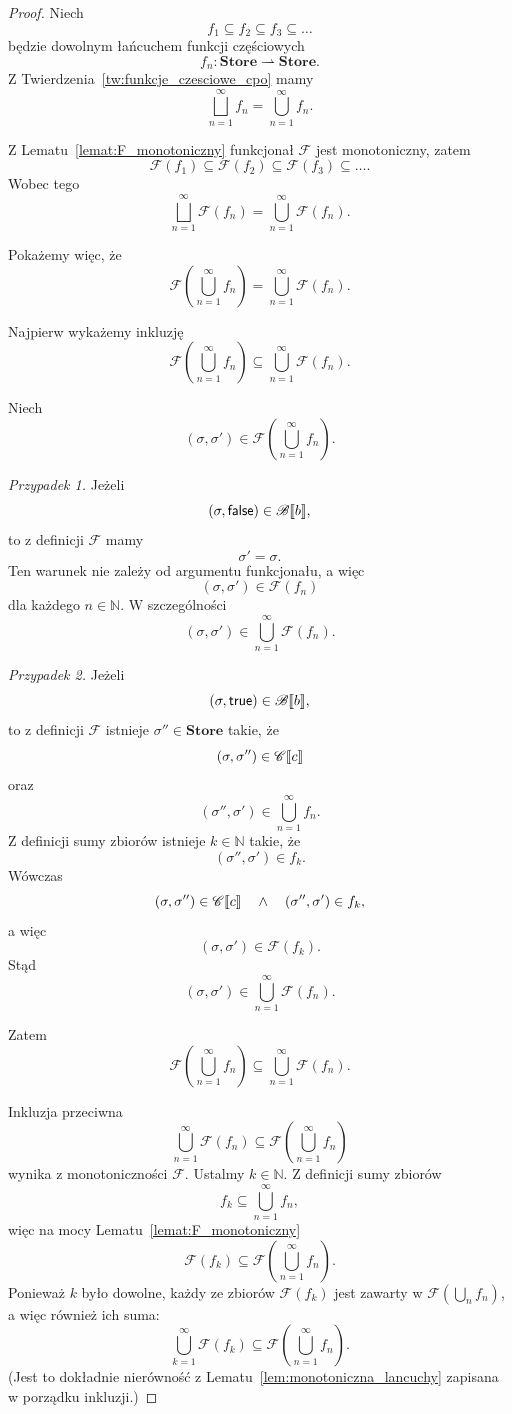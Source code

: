 \documentclass[11pt,a4paper]{article}
\theoremstyle{definition}
\theoremstyle{plain}
\DeclarePairedDelimiter{\semdelim}{\llbracket}{\rrbracket}
\newcommand{\sem}[1]{\semdelim{#1}}
\newcommand{\Cc}{\mathscr{C}}   %
\newcommand{\Bb}{\mathscr{B}}   %
\newcommand{\Store}{\textbf{Store}}
\newcommand{\kw}[1]{\ensuremath{\mathsf{#1}}} %
\begin{document}
\begin{proof}
	Niech
	\[
	f_1\subseteq f_2\subseteq f_3\subseteq\ldots
	\]
	będzie dowolnym łańcuchem funkcji częściowych
	\[
	f_n:\Store\rightharpoonup\Store.
	\]
	Z Twierdzenia~\ref{tw:funkcje_czesciowe_cpo} mamy
	\[
	\bigsqcup_{n=1}^{\infty}f_n
	=
	\bigcup_{n=1}^{\infty}f_n.
	\]
	
	Z Lematu~\ref{lemat:F_monotoniczny} funkcjonał $\mathcal{F}$ jest
	monotoniczny, zatem
	\[
	\mathcal{F}(f_1)
	\subseteq
	\mathcal{F}(f_2)
	\subseteq
	\mathcal{F}(f_3)
	\subseteq\ldots.
	\]
	Wobec tego
	\[
	\bigsqcup_{n=1}^{\infty}\mathcal{F}(f_n)
	=
	\bigcup_{n=1}^{\infty}\mathcal{F}(f_n).
	\]
	
	Pokażemy więc, że
	\[
	\mathcal{F}
	\left(
	\bigcup_{n=1}^{\infty}f_n
	\right)
	=
	\bigcup_{n=1}^{\infty}\mathcal{F}(f_n).
	\]
	
	Najpierw wykażemy inkluzję
	\[
	\mathcal{F}
	\left(
	\bigcup_{n=1}^{\infty}f_n
	\right)
	\subseteq
	\bigcup_{n=1}^{\infty}\mathcal{F}(f_n).
	\]
	
	Niech
	\[
	(\sigma,\sigma')
	\in
	\mathcal{F}
	\left(
	\bigcup_{n=1}^{\infty}f_n
	\right).
	\]
	
	\emph{Przypadek 1.}
	Jeżeli
	\[
	(\sigma,\kw{false})\in\Bb\sem{b},
	\]
	to z definicji $\mathcal{F}$ mamy
	\[
	\sigma'=\sigma.
	\]
	Ten warunek nie zależy od argumentu funkcjonału, a więc
	\[
	(\sigma,\sigma')
	\in
	\mathcal{F}(f_n)
	\]
	dla każdego $n\in\mathbb{N}$. W szczególności
	\[
	(\sigma,\sigma')
	\in
	\bigcup_{n=1}^{\infty}\mathcal{F}(f_n).
	\]
	
	\emph{Przypadek 2.}
	Jeżeli
	\[
	(\sigma,\kw{true})\in\Bb\sem{b},
	\]
	to z definicji $\mathcal{F}$ istnieje
	$\sigma''\in\Store$ takie, że
	\[
	(\sigma,\sigma'')\in\Cc\sem{c}
	\]
	oraz
	\[
	(\sigma'',\sigma')
	\in
	\bigcup_{n=1}^{\infty}f_n.
	\]
	Z definicji sumy zbiorów istnieje $k\in\mathbb{N}$ takie, że
	\[
	(\sigma'',\sigma')\in f_k.
	\]
	Wówczas
	\[
	(\sigma,\sigma'')\in\Cc\sem{c}
	\quad\land\quad
	(\sigma'',\sigma')\in f_k,
	\]
	a więc
	\[
	(\sigma,\sigma')\in\mathcal{F}(f_k).
	\]
	Stąd
	\[
	(\sigma,\sigma')
	\in
	\bigcup_{n=1}^{\infty}\mathcal{F}(f_n).
	\]
	
	Zatem
	\[
	\mathcal{F}
	\left(
	\bigcup_{n=1}^{\infty}f_n
	\right)
	\subseteq
	\bigcup_{n=1}^{\infty}\mathcal{F}(f_n).
	\]
	
	Inkluzja przeciwna
	\[
	\bigcup_{n=1}^{\infty}\mathcal{F}(f_n)
	\subseteq
	\mathcal{F}
	\left(
	\bigcup_{n=1}^{\infty}f_n
	\right)
	\]
	wynika z monotoniczności $\mathcal{F}$. Ustalmy $k\in\mathbb N$.
	Z definicji sumy zbiorów
	\[
	f_k\subseteq\bigcup_{n=1}^{\infty}f_n,
	\]
	więc na mocy Lematu~\ref{lemat:F_monotoniczny}
	\[
	\mathcal{F}(f_k)
	\subseteq
	\mathcal{F}\left(\bigcup_{n=1}^{\infty}f_n\right).
	\]
	Ponieważ $k$ było dowolne, każdy ze zbiorów $\mathcal{F}(f_k)$ jest
	zawarty w $\mathcal{F}\left(\bigcup_{n}f_n\right)$, a więc również ich
	suma:
	\[
	\bigcup_{k=1}^{\infty}\mathcal{F}(f_k)
	\subseteq
	\mathcal{F}\left(\bigcup_{n=1}^{\infty}f_n\right).
	\]
	(Jest to dokładnie nierówność z Lematu~\ref{lem:monotoniczna_lancuchy}
	zapisana w porządku inkluzji.)
	

\end{proof}
\end{document}

